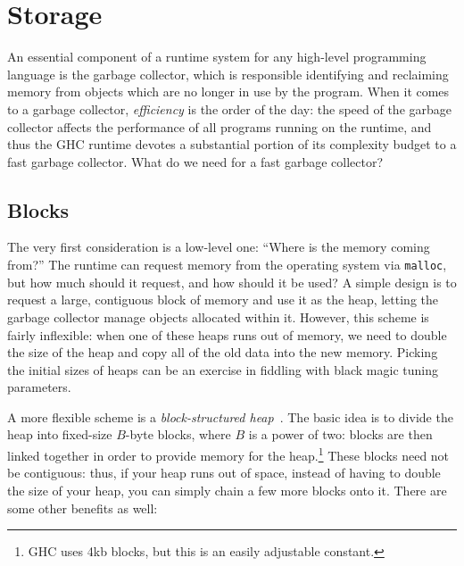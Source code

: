 \section{Storage}

An essential component of a runtime system for any high-level
programming language is the garbage collector, which is responsible
identifying and reclaiming memory from objects which are no longer in
use by the program.  When it comes to a garbage collector,
\emph{efficiency} is the order of the day: the speed of the garbage
collector affects the performance of all programs running on the
runtime, and thus the GHC runtime devotes a substantial portion of its
complexity budget to a fast garbage collector.  What do we need for
a fast garbage collector?

\subsection{Blocks}

The very first consideration is a low-level one: ``Where is the memory coming
from?''  The runtime can request memory from the operating system via
\verb|malloc|, but how much should it request, and how should it be
used?  A simple design is to request a large, contiguous block of memory
and use it as the heap, letting the garbage collector manage objects allocated
within it.  However, this scheme is fairly inflexible: when one of these heaps
runs out of memory, we need to double the size of the heap and copy all of the
old data into the new memory.  Picking the initial sizes of heaps can be an exercise
in fiddling with black magic tuning parameters.

A more flexible scheme is a \emph{block-structured heap}~\cite{maclisp,Dybvig94don'tstop,Marlow:2008:PGG:1375634.1375637}.
The basic idea is to divide the heap into fixed-size $B$-byte blocks,
where $B$ is a power of two: blocks are then linked together in order to
provide memory for the heap.\footnote{GHC uses 4kb blocks, but this is an easily
adjustable constant.}  These blocks need not be contiguous: thus, if your
heap runs out of space, instead of having to double the size of your heap,
you can simply chain a few more blocks onto it.  There are some other benefits as well:

